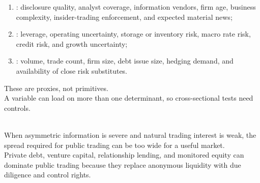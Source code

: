 \begin{taxonomy} 
\begin{enumerate}[label=\roman*.]
\setlength{\itemsep}{0pt}
\item {}: disclosure quality, analyst coverage, information vendors, firm age, business complexity, insider-trading enforcement, and expected material news;
\item {}: leverage, operating uncertainty, storage or inventory risk, macro rate risk, credit risk, and growth uncertainty;
\item {}: volume, trade count, firm size, debt issue size, hedging demand, and availability of close risk substitutes.
\end{enumerate}
These are proxies, not primitives.\\
A variable can load on more than one determinant, so cross-sectional tests need controls.
\end{taxonomy}

\begin{caveat} \\
When asymmetric information is severe and natural trading interest is weak, the spread required for public trading can be too wide for a useful market.\\
Private debt, venture capital, relationship lending, and monitored equity can dominate public trading because they replace anonymous liquidity with due diligence and control rights.
\end{caveat}
